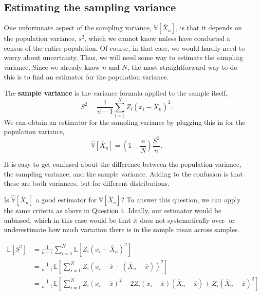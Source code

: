 \documentclass[
  letterpaper,
  DIV=11,
  numbers=noendperiod]{scrreprt}
\newcommand{\E}{\mathbb{E}}
\newcommand{\V}{\mathbb{V}}
\newcommand{\Xbar}{\overline{X}}
\theoremstyle{definition}
\theoremstyle{definition}
\theoremstyle{plain}
\theoremstyle{remark}
\begin{document}
\hypertarget{estimating-the-sampling-variance}{%
\subsection{Estimating the sampling
variance}\label{estimating-the-sampling-variance}}

One unfortunate aspect of the sampling variance, \(\V[\Xbar_n]\), is
that it depends on the population variance, \(s^2\), which we cannot
know unless have conducted a census of the entire population. Of course,
in that case, we would hardly need to worry about uncertainty. Thus, we
will need some way to estimate the sampling variance. Since we already
know \(n\) and \(N\), the most straightforward way to do this is to find
an estimator for the population variance.

The \textbf{sample variance} is the variance formula applied to the
sample itself, \[
S^2 = \frac{1}{n-1} \sum_{i=1}^N Z_i(x_i - \Xbar_n)^2.
\] We can obtain an estimator for the sampling variance by plugging this
in for the population variance, \[
\widehat{\V}[\Xbar_n] = \left(1 - \frac{n}{N}\right)\frac{S^2}{n}.
\]

\begin{tcolorbox}[enhanced jigsaw, colframe=quarto-callout-warning-color-frame, rightrule=.15mm, colback=white, breakable, opacityback=0, coltitle=black, opacitybacktitle=0.6, arc=.35mm, left=2mm, leftrule=.75mm, toptitle=1mm, colbacktitle=quarto-callout-warning-color!10!white, titlerule=0mm, title=\textcolor{quarto-callout-warning-color}{\faExclamationTriangle}\hspace{0.5em}{Mind your variances}, bottomrule=.15mm, bottomtitle=1mm, toprule=.15mm]

It is easy to get confused about the difference between the population
variance, the sampling variance, and the sample variance. Adding to the
confusion is that these are both variances, but for different
distributions.

\end{tcolorbox}

Is \(\widehat{\V}[\Xbar_n]\) a good estimator for \(\V[\Xbar_{n}]\)? To
answer this question, we can apply the same criteria as above in
Question 4. Ideally, our estimator would be unbiased, which in this case
would be that it does not systematically over- or underestimate how much
variation there is in the sample mean across samples.

\[
\begin{aligned}
\E[S^2] &= \frac{1}{n-1} \sum_{i=1}^N \E[Z_i(x_i - \Xbar_n)^2] \\
&= \frac{1}{n-1}  \E\left[\sum_{i=1}^N Z_i(x_i - \overline{x} - (\Xbar_n - \overline{x}))^2\right] \\
&= \frac{1}{n-1}  \E\left[\sum_{i=1}^N Z_i(x_i - \overline{x})^2 -2Z_i(x_i - \overline{x})(\Xbar_n - \overline{x}) + Z_i(\Xbar_n - \overline{x})^2\right] \\
\end{aligned}
\]
\end{document}
